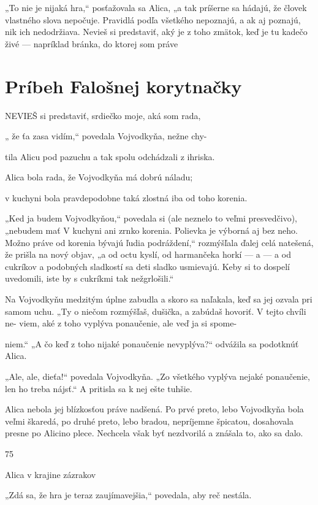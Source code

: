\documentclass[12pt]{article}
\begin{document}
\begin{Parallel}[p]{}{}
{{„To nie je nijaká hra,“ posťažovala sa Alica, „a tak
príšerne sa hádajú, že človek vlastného slova nepočuje.
Pravidlá podľa všetkého nepoznajú, a ak aj poznajú, nik ich
nedodržiava. Nevieš si predstaviť, aký je z toho zmätok, keď
je tu kadečo živé — napríklad bránka, do ktorej som práve

\section{Príbeh Falošnej korytnačky}

NEVIEŠ si predstaviť, srdiečko moje, aká som rada,

„ že ťa zasa vidím,“ povedala Vojvodkyňa, nežne chy-

tila Alicu pod pazuchu a tak spolu odchádzali z ihriska.

Alica bola rada, že Vojvodkyňa má dobrú náladu;

v kuchyni bola pravdepodobne taká zlostná iba od toho
korenia.

„Ked ja budem Vojvodkyňou,“ povedala si (ale neznelo
to veľmi presvedčivo), „nebudem mať V kuchyni ani zrnko
korenia. Polievka je výborná aj bez neho. Možno práve od
korenia bývajú ľudia podráždení,“ rozmýšľala ďalej celá
natešená, že prišla na nový objav, „a od octu kyslí, od
harmančeka horkí — a — a od cukríkov a podobných
sladkostí sa deti sladko usmievajú. Keby si to dospelí
uvedomili, iste by s cukríkmi tak nežgrlošili.“

Na Vojvodkyňu medzitým úplne zabudla a skoro sa
naľakala, keď sa jej ozvala pri samom uchu. „Ty o niečom
rozmýšľaš, dušička, a zabúdaš hovoriť. V tejto chvíli ne-
viem, aké z toho vyplýva ponaučenie, ale veď ja si spome-

niem.“
„A čo keď z toho nijaké ponaučenie nevyplýva?“ odvážila
sa podotknúť Alica.

„Ale, ale, dieťa!“ povedala Vojvodkyňa. „Zo všetkého
vyplýva nejaké ponaučenie, len ho treba nájsť.“ A pritisla sa
k nej ešte tuhšie.

Alica nebola jej blízkosťou práve nadšená. Po prvé preto,
lebo Vojvodkyňa bola veľmi škaredá, po druhé preto, lebo
bradou, nepríjemne špicatou, dosahovala presne po Alicino
plece. Nechcela však byť nezdvorilá a znášala to, ako sa
dalo.

75

Alica v krajine zázrakov

„Zdá sa, že hra je teraz zaujímavejšia,“ povedala, aby reč
nestála.

}}
\end{Parallel}
\end{document}
